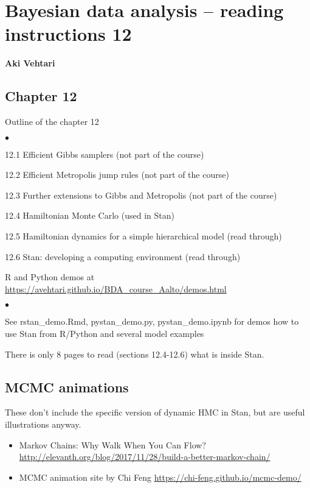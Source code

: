 \documentclass[a4paper,11pt,english]{article}
\begin{document}
\thispagestyle{empty}

\section*{Bayesian data analysis -- reading instructions 12} 
\smallskip
{\bf Aki Vehtari}
\smallskip

\subsection*{Chapter 12}

Outline of the chapter 12
\begin{list}{$\bullet$}{\parsep=0pt\itemsep=2pt}
\item 12.1 Efficient Gibbs samplers (not part of the course)
\item 12.2 Efficient Metropolis jump rules (not part of the course)
\item 12.3 Further extensions to Gibbs and Metropolis (not part of the course)
\item 12.4 Hamiltonian Monte Carlo (used in Stan)
\item 12.5 Hamiltonian dynamics for a simple hierarchical model (read through)
\item 12.6 Stan: developing a computing environment (read through)
\end{list}

R and Python demos at \url{https://avehtari.github.io/BDA_course_Aalto/demos.html}
\begin{list}{$\bullet$}{\parsep=0pt\itemsep=2pt}
\item See rstan\_demo.Rmd, pystan\_demo.py, pystan\_demo.ipynb
  for demos how to use Stan from R/Python and several model examples
\end{list}

\noindent
There is only 8 pages to read (sections 12.4-12.6) what is inside Stan.

\subsection*{MCMC animations}

These don't include the specific version of dynamic HMC in Stan, but are useful illustrations anyway.
 \begin{itemize}
 \item Markov Chains: Why Walk When You Can Flow?\\ \url{http://elevanth.org/blog/2017/11/28/build-a-better-markov-chain/}
 \item MCMC animation site by Chi Feng \url{https://chi-feng.github.io/mcmc-demo/}
 \end{itemize}
\end{document}
